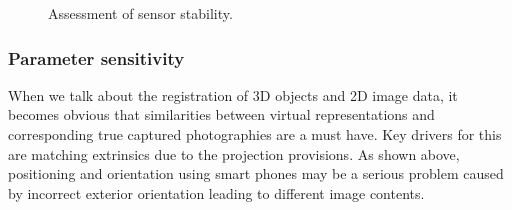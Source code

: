 \documentclass[review]{elsarticle}
\begin{document}
\begin{figure}[htbp!]
\begin{center}
	 	\begin{minipage}{\columnwidth}
	 		\centering
	 	\end{minipage} 
	 	\begin{minipage}{\columnwidth}
	 		\centering
	 	\end{minipage}
		
		\caption{Assessment of sensor stability.}
		\label{fig:sensor_sensi:imu_sensor_stabi_s8_nex5}
\end{center}
\end{figure}













\subsubsection{Parameter sensitivity}
\label{sec:technology:sensors:sensitivity}
When we talk about the registration of 3D objects and 2D image data, it becomes obvious that similarities between virtual representations and corresponding true captured photographies are a must have. Key drivers for this are matching extrinsics due to the projection provisions. As shown above, positioning and orientation using smart phones may be a serious problem caused by incorrect exterior orientation leading to different image contents. 
\end{document}
